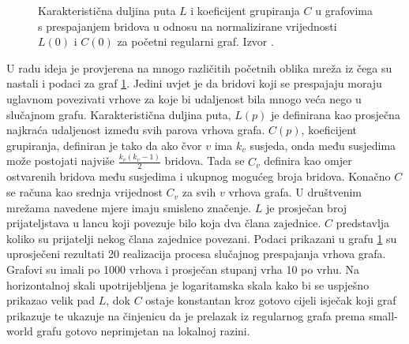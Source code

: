 \documentclass[times, utf8, diplomski]{fer}
\begin{document}
\begin{figure}
	\caption{Karakteristična duljina puta $L$ i koeficijent grupiranja $C$ u grafovima s prespajanjem bridova u odnosu na normalizirane vrijednosti $L(0)$ i $C(0)$ za početni regularni graf. Izvor \cite{watts1998collective}.}
	\label{fig:C&L}
\end{figure}

U radu\cite{watts1998collective} ideja je provjerena na mnogo različitih početnih oblika mreža iz čega su nastali i podaci za graf \ref{fig:C&L}. Jedini uvjet je da bridovi koji se prespajaju moraju uglavnom povezivati vrhove za koje bi udaljenost bila mnogo veća nego u slučajnom grafu. Karakteristična duljina puta, $L(p)$ je definirana kao prosječna najkraća udaljenost između svih parova vrhova grafa. $C(p)$, koeficijent grupiranja, definiran je tako da ako čvor $v$ ima $k_{v}$ susjeda, onda među susjedima može postojati najviše $\frac{k_{v}(k_{v} - 1)}{2}$ bridova. Tada se $C_{v}$ definira kao omjer ostvarenih bridova među susjedima i ukupnog mogućeg broja bridova. Konačno $C$ se računa kao srednja vrijednost $C_{v}$ za svih $v$ vrhova grafa. U društvenim mrežama navedene mjere imaju smisleno značenje. $L$ je prosječan broj prijateljstava u lancu koji povezuje bilo koja dva člana zajednice. $C$ predstavlja koliko su prijatelji nekog člana zajednice povezani. Podaci prikazani u grafu \ref{fig:C&L} su uprosječeni rezultati 20 realizacija procesa slučajnog prespajanja vrhova grafa. Grafovi su imali po 1000 vrhova i prosječan stupanj vrha 10 po vrhu. Na horizontalnoj skali upotrijebljena je logaritamska skala kako bi se uspješno prikazao velik pad  $L$, dok $C$ ostaje konstantan kroz gotovo cijeli isječak koji graf prikazuje te ukazuje na činjenicu da je prelazak iz regularnog grafa prema small-world grafu gotovo neprimjetan na lokalnoj razini.
\end{document}
